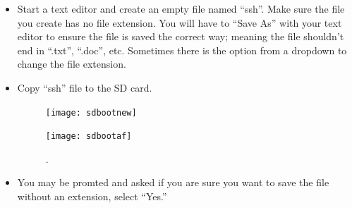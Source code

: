 \documentclass{article}
\begin{document}
\begin{enumerate}
\begin{itemize}
\begin{itemize}
\item Save file (Figure~\ref{fig:Mac2}).

\begin{figure}[h]
\centering
\texttt{[image: 1\_MACtext\_2]}
\caption{Save file with out richtext formatting.}
\label{fig:Mac2}
\end{figure}

  \item Open a new document (Figure~\ref{fig:Mac3}).

\begin{figure}[h]
\centering
\texttt{[image: 1\_MACtext\_3]}
\caption{Save empty file}
\label{fig:Mac3}
\end{figure}
  \item Save file without richtext (Figure~\ref{fig:Mac4}).

\begin{figure}[h]
\centering
\texttt{[image: 1\_MACtext\_4]}
\caption{Get information on the file}
\label{fig:Mac4}
\end{figure}

  \item Remove extension. (Figure~\ref{fig:Mac5}).

\begin{figure}[h]
\centering
\texttt{[image: 1\_MACtext\_5]}
\caption{Remove file name extension.}
\label{fig:Mac5}
\end{figure}

\end{itemize}

\noindent \textbf{For PC Users:} 

  \item Start a text editor and create an empty file named ``ssh''. Make sure the file you create has no file extension. You will have to ``Save As'' with your text editor to ensure the file is saved the correct way; meaning the file shouldn't end in ``.txt'', ``.doc'', etc. Sometimes there is the option from a dropdown to change the file extension.
  
\item Copy ``ssh'' file to the SD card. 
\begin{figure}
  \texttt{[image: sdbootnew]}
\end{figure}


\begin{figure}
  \texttt{[image: sdbootaf]}
  \caption{.}
  \label{fig:sdbootf}
\end{figure}

  \item You may be promted and asked if you are sure you want to save the file without an extension, select ``Yes.''


\end{itemize}
\end{enumerate}
\end{document}

